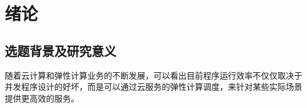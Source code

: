 
\chapter{绪论}

%



%



%
%




%
%
%

\section{选题背景及研究意义}

随着云计算和弹性计算业务的不断发展，可以看出目前程序运行效率不仅仅取决于并发程序设计的好坏，而是可以通过云服务的弹性计算调度，来针对某些实际场景
提供更高效的服务\cite{wfwbpyy}。

